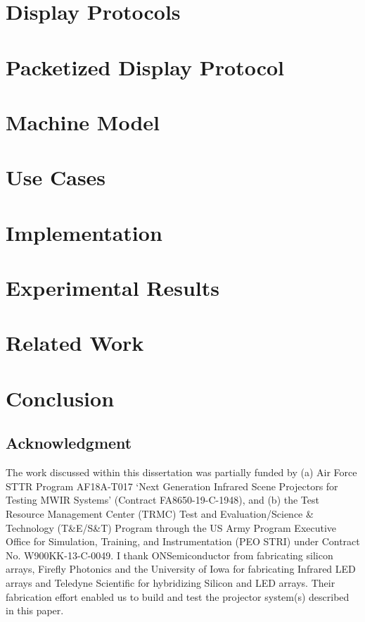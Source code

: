 \documentclass{udthesis}
\begin{document}
    \chapter{Display Protocols} %
        
    \chapter{Packetized Display Protocol}
        
    \chapter{Machine Model}
        
    \chapter{Use Cases}
        
    \chapter{Implementation}
        
    \chapter{Experimental Results}
        
    \chapter{Related Work}
        
    \chapter*{Conclusion}
        

    \section*{Acknowledgment}
        The work discussed within this dissertation was partially funded by (a) Air Force STTR Program AF18A-T017 `Next Generation Infrared Scene Projectors for Testing MWIR Systems' (Contract FA8650-19-C-1948), and (b) the Test Resource Management Center (TRMC) Test and Evaluation/Science \& Technology (T\&E/S\&T) Program through the US Army Program Executive Office for Simulation, Training, and Instrumentation (PEO STRI) under Contract No. W900KK-13-C-0049. I thank ONSemiconductor from fabricating silicon arrays, Firefly Photonics and the University of Iowa for fabricating Infrared LED arrays and Teledyne Scientific for hybridizing Silicon and LED arrays. Their fabrication effort enabled us to build and test the projector system(s) described in this paper.
\end{document}
